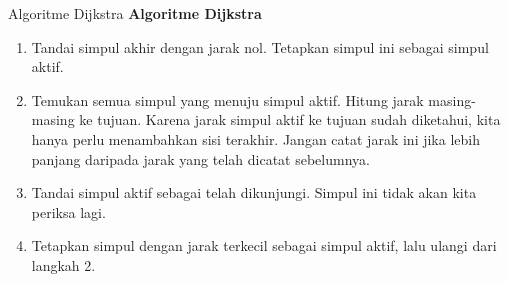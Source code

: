 \begin{algorithm}{Algoritme Dijkstra}{}{}
{\Large \textbf{Algoritme Dijkstra} } \\
\hspace{3in}

\begin{enumerate}
\item	Tandai simpul akhir dengan jarak nol.  Tetapkan simpul ini sebagai simpul aktif.

\dijkstra{$\infty$}{$\infty$}{$\infty$}{$\infty$}{$\infty$}{$\infty$}

\item Temukan semua simpul yang menuju simpul aktif.  Hitung jarak masing-masing ke tujuan.  Karena jarak simpul aktif ke tujuan sudah diketahui, kita hanya perlu menambahkan sisi terakhir.  Jangan catat jarak ini jika lebih panjang daripada jarak yang telah dicatat sebelumnya.
\item	Tandai simpul aktif sebagai telah dikunjungi.  Simpul ini tidak akan kita periksa lagi.
\item	Tetapkan simpul dengan jarak terkecil sebagai simpul aktif, lalu ulangi dari langkah 2.
\end{enumerate}
 \end{algorithm}

